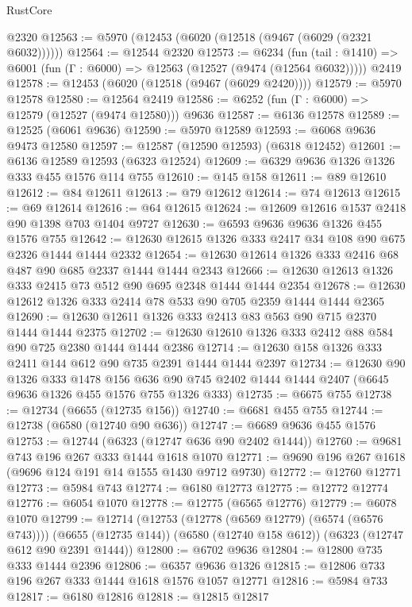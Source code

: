 \begin{lexlean}{RustCore}
\begin{coremodule}
{\begin{coremodule}
{{{{{{{{{{{{{{{{{{{{{{{{{{{{{{{{{{{{{{{{{{{{{    @2320
@12563 := @5970 (@12453 (@6020 (@12518 (@9467 (@6029 (@2321 @6032))))))
@12564 := @12544 @2320
@12573 := @6234
    (fun (tail : @1410) => @6001 (fun (Γ : @6000) => @12563 (@12527 (@9474 (@12564 @6032)))))
    @2419
@12578 := @12453 (@6020 (@12518 (@9467 (@6029 @2420))))
@12579 := @5970 @12578
@12580 := @12564 @2419
@12586 := @6252 (fun (Γ : @6000) => @12579 (@12527 (@9474 @12580))) @9636
@12587 := @6136 @12578
@12589 := @12525 (@6061 @9636)
@12590 := @5970 @12589
@12593 := @6068 @9636 @9473 @12580
@12597 := @12587 (@12590 @12593) (@6318 @12452)
@12601 := @6136 @12589 @12593 (@6323 @12524)
@12609 := @6329 @9636 @1326 @1326 @333 @455 @1576 @114 @755
@12610 := @145 @158
@12611 := @89 @12610
@12612 := @84 @12611
@12613 := @79 @12612
@12614 := @74 @12613
@12615 := @69 @12614
@12616 := @64 @12615
@12624 := @12609 @12616 @1537 @2418 @90 @1398 @703 @1404 @9727
@12630 := @6593 @9636 @9636 @1326 @455 @1576 @755
@12642 := @12630 @12615 @1326 @333 @2417 @34 @108 @90 @675 @2326 @1444 @1444 @2332
@12654 := @12630 @12614 @1326 @333 @2416 @68 @487 @90 @685 @2337 @1444 @1444 @2343
@12666 := @12630 @12613 @1326 @333 @2415 @73 @512 @90 @695 @2348 @1444 @1444 @2354
@12678 := @12630 @12612 @1326 @333 @2414 @78 @533 @90 @705 @2359 @1444 @1444 @2365
@12690 := @12630 @12611 @1326 @333 @2413 @83 @563 @90 @715 @2370 @1444 @1444 @2375
@12702 := @12630 @12610 @1326 @333 @2412 @88 @584 @90 @725 @2380 @1444 @1444 @2386
@12714 := @12630 @158 @1326 @333 @2411 @144 @612 @90 @735 @2391 @1444 @1444 @2397
@12734 := @12630
    @90
    @1326
    @333
    @1478
    @156
    @636
    @90
    @745
    @2402
    @1444
    @1444
    @2407
    (@6645 @9636 @1326 @455 @1576 @755 @1326 @333)
@12735 := @6675 @755
@12738 := @12734 (@6655 (@12735 @156))
@12740 := @6681 @455 @755
@12744 := @12738 (@6580 (@12740 @90 @636))
@12747 := @6689 @9636 @455 @1576
@12753 := @12744 (@6323 (@12747 @636 @90 @2402 @1444))
@12760 := @9681 @743 @196 @267 @333 @1444 @1618 @1070
@12771 := @9690 @196 @267 @1618 (@9696 @124 @191 @14 @1555 @1430 @9712 @9730)
@12772 := @12760 @12771
@12773 := @5984 @743
@12774 := @6180 @12773
@12775 := @12772 @12774
@12776 := @6054 @1070
@12778 := @12775 (@6565 @12776)
@12779 := @6078 @1070
@12799 := @12714
    (@12753 (@12778 (@6569 @12779) (@6574 (@6576 @743))))
    (@6655 (@12735 @144))
    (@6580 (@12740 @158 @612))
    (@6323 (@12747 @612 @90 @2391 @1444))
@12800 := @6702 @9636
@12804 := @12800 @735 @333 @1444 @2396
@12806 := @6357 @9636 @1326
@12815 := @12806 @733 @196 @267 @333 @1444 @1618 @1576 @1057 @12771
@12816 := @5984 @733
@12817 := @6180 @12816
@12818 := @12815 @12817
}}}}}}}}}}}}}}}}}}}}}}}}}}}}}}}}}}}}}}}}}}}}}
\end{coremodule}}
\end{coremodule}
\end{lexlean}
